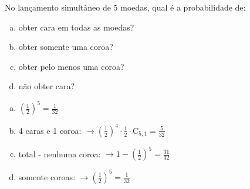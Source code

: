 \begin{ex}
    No lançamento simultâneo de 5 moedas, qual é a probabilidade de:
   \begin{enumerate}[(a)]
   \item obter cara em todas as moedas?
   \item obter somente uma coroa?
   \item obter pelo menos uma coroa? 
   \item não obter cara?
   \end{enumerate}
     \begin{sol}
       \phantom{A}
         \begin{enumerate} [(a)]
             \item $(\frac{1}{2})^5=\frac{1}{32}$
             \item 4 caras e 1 coroa: $\rightarrow (\frac{1}{2})^4\cdot\frac{1}{2}\cdot\mathrm{C}_{5,1}=\frac{5}{32}$
             \item total - nenhuma coroa: $\rightarrow 1-(\frac{1}{2})^5=\frac{31}{32}$
             \item somente coroas: $\rightarrow (\frac{1}{2})^5=\frac{1}{32}$
         \end{enumerate}
     \end{sol}
\end{ex}